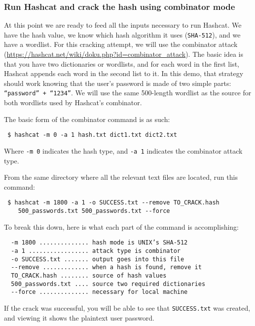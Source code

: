 \subsubsection{Run Hashcat and crack the hash using combinator mode}
  At this point we are ready to feed all the inputs necessary to run Hashcat. We have the hash value, we know which hash algorithm it uses (\verb|SHA-512|), and we have a wordlist. For this cracking attempt, we will use the combinator attack (\url{https://hashcat.net/wiki/doku.php?id=combinator_attack}). The basic idea is that you have two dictionaries or wordlists, and for each word in the first list, Hashcat appends each word in the second list to it. In this demo, that strategy should work knowing that the user’s password is made of two simple parts: \verb|“password” + “1234”|. We will use the same 500-length wordlist as the source for both wordlists used by Hashcat’s combinator.
  \newline

  \noindent
  The basic form of the combinator command is as such:
  \begin{verbatim} $ hashcat -m 0 -a 1 hash.txt dict1.txt dict2.txt \end{verbatim}
  \noindent
  Where \verb|-m 0| indicates the hash type, and \verb|-a 1| indicates the combinator attack type.
  \newline

  \noindent
  From the same directory where all the relevant text files are located, run this command:
  \begin{verbatim} $ hashcat -m 1800 -a 1 -o SUCCESS.txt --remove TO_CRACK.hash
    500_passwords.txt 500_passwords.txt --force \end{verbatim}

  \noindent
  To break this down, here is what each part of the command is accomplishing:
  \begin{verbatim}
  -m 1800 .............. hash mode is UNIX’s SHA-512
  -a 1 ................. attack type is combinator
  -o SUCCESS.txt ....... output goes into this file
  --remove ............. when a hash is found, remove it
  TO_CRACK.hash ........ source of hash values
  500_passwords.txt .... source two required dictionaries
  --force .............. necessary for local machine
  \end{verbatim}

  \noindent
  If the crack was successful, you will be able to see that \verb|SUCCESS.txt| was created, and viewing it shows the plaintext user password.


